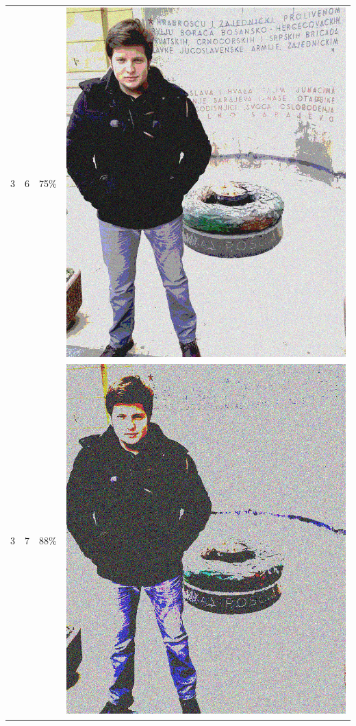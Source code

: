 \documentclass[times, utf8, seminar, numeric]{fer}
\begin{document}
\begin{center}
\begin{longtable}{|c|c|c|c|}
3 & 6 &75\% & \includegraphics[scale=0.3]{../benchmark_results/pattern/3_components-6_bits.png} \\
3 & 7 &88\% & \includegraphics[scale=0.3]{../benchmark_results/pattern/3_components-7_bits.png} \\

\end{longtable}
\end{center}
\end{document}
